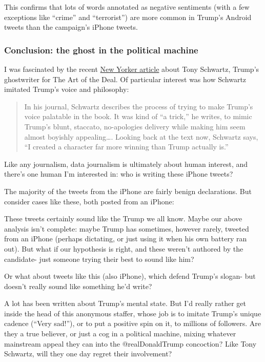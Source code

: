 \documentclass[
]{article}
\begin{document}
This confirms that lots of words annotated as negative sentiments (with
a few exceptions like ``crime'' and ``terrorist'') are more common in
Trump's Android tweets than the campaign's iPhone tweets.

\hypertarget{conclusion-the-ghost-in-the-political-machine}{%
\subsubsection{Conclusion: the ghost in the political
machine}\label{conclusion-the-ghost-in-the-political-machine}}

I was fascinated by the recent
\href{http://www.newyorker.com/magazine/2016/07/25/donald-trumps-ghostwriter-tells-all}{New
Yorker article} about Tony Schwartz, Trump's ghostwriter for The Art of
the Deal. Of particular interest was how Schwartz imitated Trump's voice
and philosophy:

\begin{quote}
In his journal, Schwartz describes the process of trying to make Trump's
voice palatable in the book. It was kind of ``a trick,'' he writes, to
mimic Trump's blunt, staccato, no-apologies delivery while making him
seem almost boyishly appealing\ldots. Looking back at the text now,
Schwartz says, ``I created a character far more winning than Trump
actually is.''
\end{quote}

Like any journalism, data journalism is ultimately about human interest,
and there's one human I'm interested in: who is writing these iPhone
tweets?

The majority of the tweets from the iPhone are fairly benign
declarations. But consider cases like these, both posted from an iPhone:

These tweets certainly sound like the Trump we all know. Maybe our above
analysis isn't complete: maybe Trump has sometimes, however rarely,
tweeted from an iPhone (perhaps dictating, or just using it when his own
battery ran out). But what if our hypothesis is right, and these weren't
authored by the candidate- just someone trying their best to sound like
him?

Or what about tweets like this (also iPhone), which defend Trump's
slogan- but doesn't really sound like something he'd write?

A lot has been written about Trump's mental state. But I'd really rather
get inside the head of this anonymous staffer, whose job is to imitate
Trump's unique cadence (``Very sad!''), or to put a positive spin on it,
to millions of followers. Are they a true believer, or just a cog in a
political machine, mixing whatever mainstream appeal they can into the
@realDonaldTrump concoction? Like Tony Schwartz, will they one day
regret their involvement?
\end{document}
